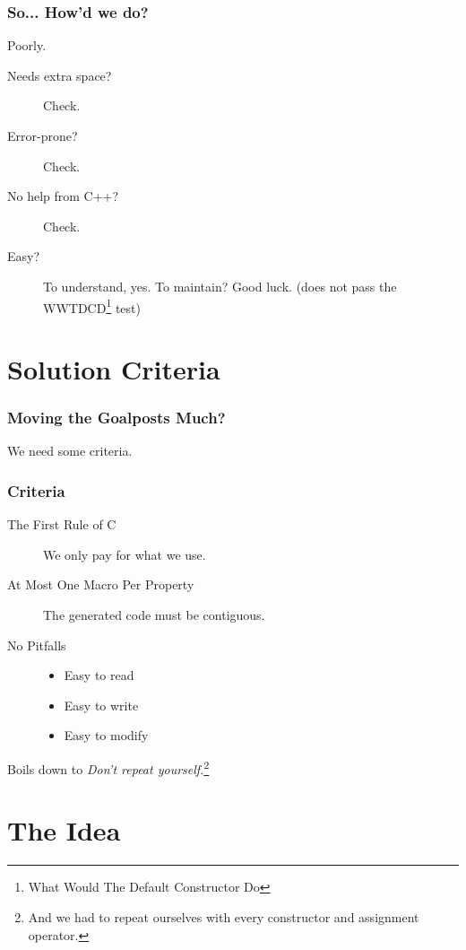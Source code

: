 \documentclass{beamer}
\newcommand{\CC}{C\nolinebreak\hspace{-.05em}\raisebox{0.4ex}{\resizebox{!}{0.6\baselineskip}{\bf++}}}
\newcommand{\cplusplus}{\protect\CC\xspace}
\begin{document}
\begin{frame}[fragile]
  \frametitle{So... How'd we do?}
\begin{center}
{\Huge Poorly.}
\end{center}
\begin{description}
  \item[Needs extra space?] Check.
  \item[Error-prone?] Check.
  \item[No help from C++?] Check.
  \item[Easy?] To understand, yes. To maintain? Good luck.
    (does not pass the WWTDCD\footnote{What Would The Default Constructor Do}
    test)
\end{description}
\end{frame}


\section{Solution Criteria}
\begin{frame}
  \frametitle{Moving the Goalposts Much?}
\begin{center}
{\Huge We need some criteria.}
\end{center}
\end{frame}


\begin{frame}[fragile]
  \frametitle{Criteria}
  \begin{description}
    \item[The First Rule of \cplusplus]\pause
      We only pay for what we use.
    \item[At Most One Macro Per Property]
      The generated code must be contiguous.\pause
    \item[No Pitfalls]
      \begin{itemize}
        \item Easy to read
        \item Easy to write
        \item Easy to modify
      \end{itemize}
  \end{description}
  \begin{center}
    Boils down to \emph{Don't repeat yourself.}\footnote{And we had to repeat
    ourselves with every constructor and assignment operator.}
  \end{center}
\end{frame}


\section{The Idea}
\end{document}
